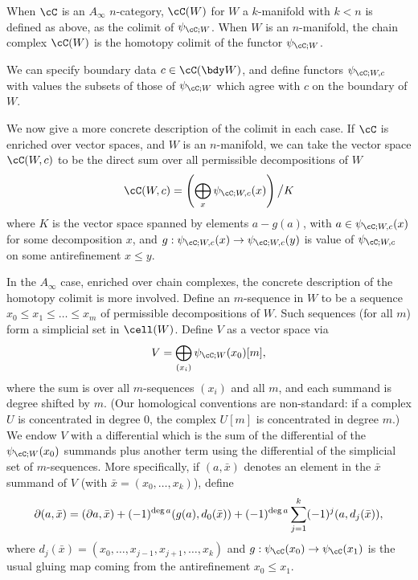 \begin{defn}
When $\cC$ is an $A_\infty$ $n$-category, $\cC(W)$ for $W$ a $k$-manifold with $k < n$ 
is defined as above, as the colimit of $\psi_{\cC;W}$.
When $W$ is an $n$-manifold, the chain complex $\cC(W)$ is the homotopy colimit of the functor $\psi_{\cC;W}$.
\end{defn}

We can specify boundary data $c \in \cC(\bdy W)$, and define functors $\psi_{\cC;W,c}$ 
with values the subsets of those of $\psi_{\cC;W}$ which agree with $c$ on the boundary of $W$.

We now give a more concrete description of the colimit in each case.
If $\cC$ is enriched over vector spaces, and $W$ is an $n$-manifold, 
we can take the vector space $\cC(W,c)$ to be the direct sum over all permissible decompositions of $W$
\begin{equation*}
	\cC(W,c) = \left( \bigoplus_x \psi_{\cC;W,c}(x)\right) \big/ K
\end{equation*}
where $K$ is the vector space spanned by elements $a - g(a)$, with
$a\in \psi_{\cC;W,c}(x)$ for some decomposition $x$, and $g: \psi_{\cC;W,c}(x)
\to \psi_{\cC;W,c}(y)$ is value of $\psi_{\cC;W,c}$ on some antirefinement $x \leq y$.

In the $A_\infty$ case, enriched over chain complexes, the concrete description of the homotopy colimit
is more involved.
Define an $m$-sequence in $W$ to be a sequence $x_0 \le x_1 \le \dots \le x_m$ of permissible decompositions of $W$.
Such sequences (for all $m$) form a simplicial set in $\cell(W)$.
Define $V$ as a vector space via
\[
	V = \bigoplus_{(x_i)} \psi_{\cC;W}(x_0)[m] ,
\]
where the sum is over all $m$-sequences $(x_i)$ and all $m$, and each summand is degree shifted by $m$. 
(Our homological conventions are non-standard: if a complex $U$ is concentrated in degree $0$, 
the complex $U[m]$ is concentrated in degree $m$.)
We endow $V$ with a differential which is the sum of the differential of the $\psi_{\cC;W}(x_0)$
summands plus another term using the differential of the simplicial set of $m$-sequences.
More specifically, if $(a, \bar{x})$ denotes an element in the $\bar{x}$
summand of $V$ (with $\bar{x} = (x_0,\dots,x_k)$), define
\[
	\partial (a, \bar{x}) = (\partial a, \bar{x}) + (-1)^{\deg{a}} (g(a), d_0(\bar{x})) + (-1)^{\deg{a}} \sum_{j=1}^k (-1)^{j} (a, d_j(\bar{x})) ,
\]
where $d_j(\bar{x}) = (x_0,\dots,x_{j-1},x_{j+1},\dots,x_k)$ and $g: \psi_\cC(x_0)\to \psi_\cC(x_1)$
is the usual gluing map coming from the antirefinement $x_0 \le x_1$.

